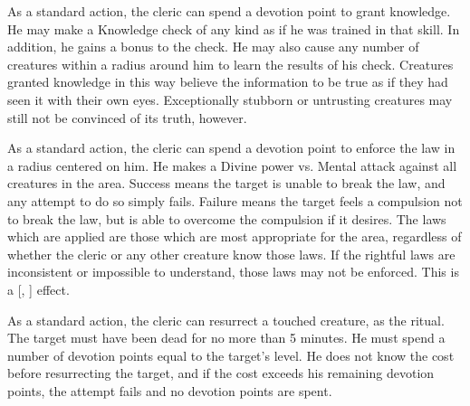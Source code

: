    As a standard action, the cleric can spend a devotion point to grant knowledge.
    He may make a Knowledge check of any kind as if he was trained in that skill.
    In addition, he gains a  bonus to the check.
    He may also cause any number of creatures within a \arealarge radius around him to learn the results of his check.
    Creatures granted knowledge in this way believe the information to be true as if they had seen it with their own eyes.
    Exceptionally stubborn or untrusting creatures may still not be convinced of its truth, however.

    As a standard action, the cleric can spend a devotion point to enforce the law in a \arealarge radius  centered on him.
    He makes a Divine power vs. Mental attack against all creatures in the area.
    Success means the target is unable to break the law, and any attempt to do so simply fails.
    Failure means the target feels a compulsion not to break the law, but is able to overcome the compulsion if it desires.
    The laws which are applied are those which are most appropriate for the area, regardless of whether the cleric or any other creature know those laws.
    If the rightful laws are inconsistent or impossible to understand, those laws may not be enforced.
    This is a [, ] effect.

    As a standard action, the cleric can resurrect a touched creature, as the  ritual.
    The target must have been dead for no more than 5 minutes.
    He must spend a number of devotion points equal to the target's level.
    He does not know the cost before resurrecting the target, and if the cost exceeds his remaining devotion points, the attempt fails and no devotion points are spent.

